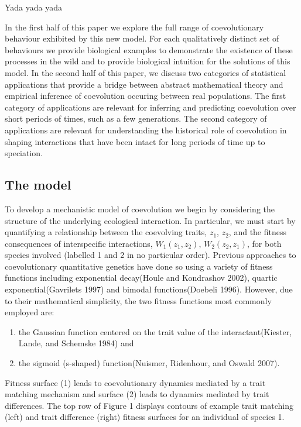 \documentclass[]{article}
\begin{document}
Yada yada yada

In the first half of this paper we explore the full range of
coevolutionary behaviour exhibited by this new model. For each
qualitatively distinct set of behaviours we provide biological examples
to demonstrate the existence of these processes in the wild and to
provide biological intuition for the solutions of this model. In the
second half of this paper, we discuss two categories of statistical
applications that provide a bridge between abstract mathematical theory
and empirical inference of coevolution occuring between real
populations. The first category of applications are relevant for
inferring and predicting coevolution over short periods of times, such
as a few generations. The second category of applications are relevant
for understanding the historical role of coevolution in shaping
interactions that have been intact for long periods of time up to
speciation.

\hypertarget{the-model}{%
\subsection{The model}\label{the-model}}

To develop a mechanistic model of coevolution we begin by considering
the structure of the underlying ecological interaction. In particular,
we must start by quantifying a relationship between the coevolving
traits, \(z_1\), \(z_2\), and the fitness consequences of interspecific
interactions, \(W_1(z_1,z_2)\), \(W_2(z_2,z_1)\), for both species
involved (labelled 1 and 2 in no particular order). Previous approaches
to coevolutionary quantitative genetics have done so using a variety of
fitness functions including exponential decay(Houle and Kondrashov
2002), quartic exponential(Gavrilets 1997) and bimodal functions(Doebeli
1996). However, due to their mathematical simplicity, the two fitness
functions most commonly employed are:

\begin{enumerate}
\def\labelenumi{(\arabic{enumi})}
\item
  the Gaussian function centered on the trait value of the
  interactant(Kiester, Lande, and Schemske 1984) and
\item
  the sigmoid (s-shaped) function(Nuismer, Ridenhour, and Oswald 2007).
\end{enumerate}

Fitness surface (1) leads to coevolutionary dynamics mediated by a trait
matching mechanism and surface (2) leads to dynamics mediated by trait
differences. The top row of Figure 1 displays contours of example trait
matching (left) and trait difference (right) fitness surfaces for an
individual of species 1.
\end{document}
